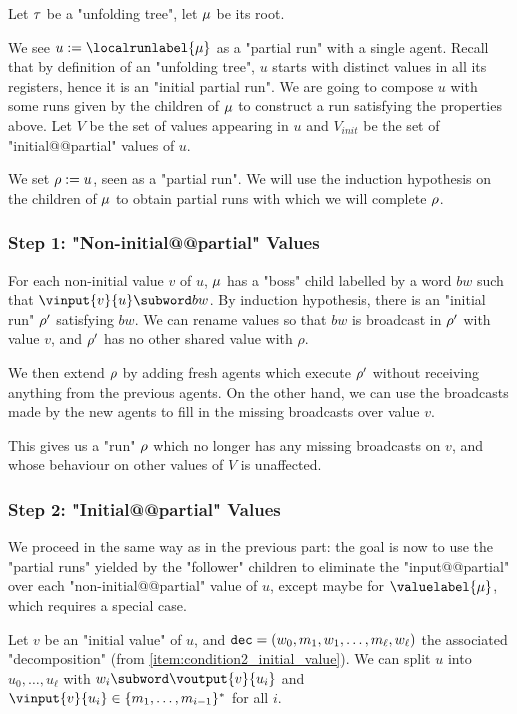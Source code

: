 Let $\tau$ be a "unfolding tree", let $\mu$ be its root.

We see $u := \localrunlabel{\node}$ as a "partial run" with a single agent. Recall that by definition of an "unfolding tree", $u$ starts with distinct values in all its registers, hence it is an "initial partial run".
We are going to compose $u$ with some runs given by the children of $\mu$ to construct a run satisfying the properties above.
Let $V$ be the set of values appearing in $u$ and $V_{init}$ be the set of "initial@@partial" values of $u$.

We set $\rho := u$, seen as a "partial run". We will use the induction hypothesis on the children of $\mu$ to obtain partial runs with which we will complete $\rho$.

\subsubsection{Step 1: "Non-initial@@partial" Values}
\label{sec:tree-to-run-step-one}

For each non-initial value $v$ of $u$, $\mu$ has a "boss" child labelled by a word $bw$ such that $\vinput{v}{u} \subword bw$.
By induction hypothesis, there is an "initial run" $\rho'$ satisfying $bw$.
We can rename values so that $bw$ is broadcast in $\rho'$ with value $v$, and $\rho'$ has no other shared value with $\rho$.

We then extend $\rho$ by adding fresh agents which execute $\rho'$ without receiving anything from the previous agents. On the other hand, we can use the broadcasts made by the new agents to fill in the missing broadcasts over value $v$.

This gives us a "run" $\rho$ which no longer has any missing broadcasts on $v$, and whose behaviour on other values of $V$ is unaffected.

\subsubsection{Step 2: "Initial@@partial" Values}
\label{sec:tree-to-run-step-two}

We proceed in the same way as in the previous part: the goal is now to use the "partial runs" yielded by the "follower" children to eliminate the "input@@partial" over each "non-initial@@partial" value of $u$, except maybe for $\valuelabel{\node}$, which requires a special case.

Let $v$ be an "initial value" of $u$, and $\mathtt{dec} = (w_0, m_1, w_1, \ldots, m_\ell, w_\ell)$ the associated "decomposition" (from \ref{item:condition2_initial_value}). We can split $u$ into $u_0, \ldots, u_\ell$ with $w_i \subword \voutput{\aval}{\localrun_i}$ and $\vinput{\aval}{\localrun_i} \in \set{m_1, \dots, m_{i-1}}^*$ for all $i$. 

